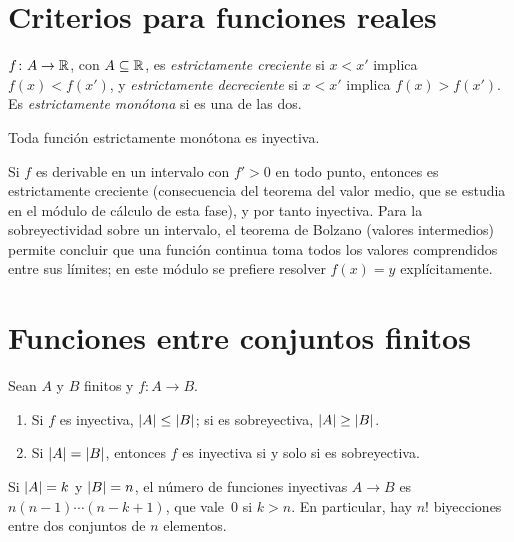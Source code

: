 \addtocounter{definicion}{1}%

\addtocounter{definicion}{1}%

\addtocounter{definicion}{1}%

\addtocounter{definicion}{1}%

\section{Criterios para funciones reales}

\begin{definicion}
$f\colon A\to\mathbb{R}$, con $A\subseteq\mathbb{R}$, es \emph{estrictamente creciente} si $x<x'$ implica $f(x)<f(x')$, y \emph{estrictamente decreciente} si $x<x'$ implica $f(x)>f(x')$. Es \emph{estrictamente monótona} si es una de las dos.
\end{definicion}

\begin{proposicion}\label{prop:t3-monotona}
Toda función estrictamente monótona es inyectiva.
\end{proposicion}

Si $f$ es derivable en un intervalo con $f'>0$ en todo punto, entonces es estrictamente creciente (consecuencia del teorema del valor medio, que se estudia en el módulo de cálculo de esta fase), y por tanto inyectiva. Para la sobreyectividad sobre un intervalo, el teorema de Bolzano (valores intermedios) permite concluir que una función continua toma todos los valores comprendidos entre sus límites; en este módulo se prefiere resolver $f(x)=y$ explícitamente.

\addtocounter{definicion}{1}%

\section{Funciones entre conjuntos finitos}

\begin{proposicion}\label{prop:t3-finitos}
Sean $A$ y $B$ finitos y $f\colon A\to B$.
\begin{enumerate}
  \item Si $f$ es inyectiva, $\lvert A\rvert\le\lvert B\rvert$; si es sobreyectiva, $\lvert A\rvert\ge\lvert B\rvert$.
  \item Si $\lvert A\rvert=\lvert B\rvert$, entonces $f$ es inyectiva si y solo si es sobreyectiva.
\end{enumerate}
\end{proposicion}

\begin{proposicion}\label{prop:t3-contar-iny}
Si $\lvert A\rvert=k$ y $\lvert B\rvert=n$, el número de funciones inyectivas $A\to B$ es $n(n-1)\cdots(n-k+1)$, que vale~0 si $k>n$. En particular, hay $n!$ biyecciones entre dos conjuntos de $n$ elementos.
\end{proposicion}

\addtocounter{definicion}{1}%

\addtocounter{definicion}{1}%

